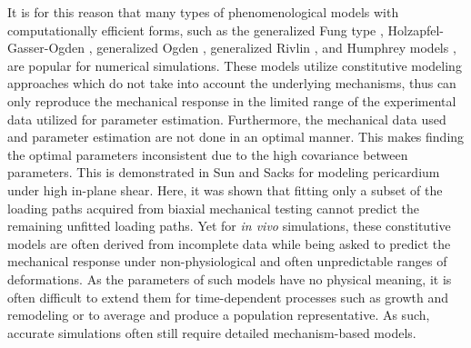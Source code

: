     It is for this reason that many types of phenomenological models with computationally efficient forms, such as the generalized Fung type \cite{fung_biomechanics_1993}, Holzapfel-Gasser-Ogden \cite{holzapfel_new_2000}, generalized Ogden \cite{ogden_large_1972}, generalized Rivlin \cite{rivlin_large_1951}, and Humphrey models \cite{may-newman_constitutive_1998}, are popular for numerical simulations. These models utilize constitutive modeling approaches which do not take into account the underlying mechanisms, thus can only reproduce the mechanical response in the limited range of the experimental data utilized for parameter estimation. Furthermore, the mechanical data used and parameter estimation are not done in an optimal manner. This makes finding the optimal parameters inconsistent due to the high covariance between parameters. This is demonstrated in Sun and Sacks \cite{sun_biaxial_2003} for modeling pericardium under high in-plane shear. Here, it was shown that fitting only a subset of the loading paths acquired from biaxial mechanical testing cannot predict the remaining unfitted loading paths. Yet for \textit{in vivo} simulations, these constitutive models are often derived from incomplete data while being asked to predict the mechanical response under non-physiological and often unpredictable ranges of deformations. As the parameters of such models have no physical meaning, it is often difficult to extend them for time-dependent processes such as growth and remodeling or to average and produce a population representative. As such, accurate simulations often still require detailed mechanism-based models. 
    

